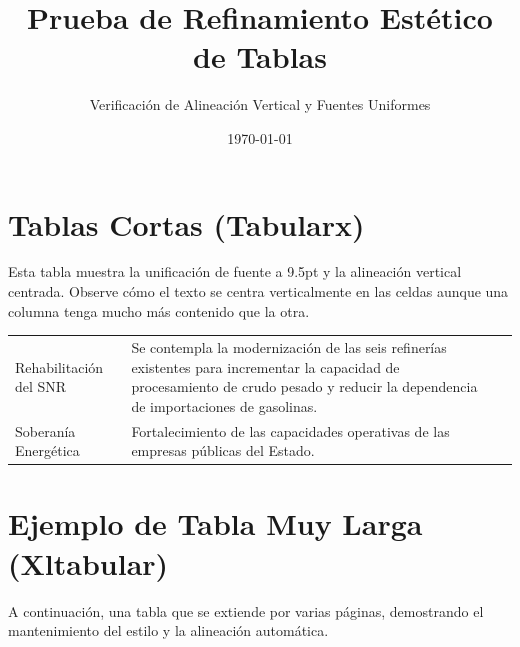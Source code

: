 \documentclass{sener2025}
\title{Prueba de Refinamiento Estético de Tablas}
\subtitle{Verificación de Alineación Vertical y Fuentes Uniformes}
\date{\today}
\begin{document}
\maketitle


\section{Tablas Cortas (Tabularx)}

Esta tabla muestra la unificación de fuente a 9.5pt y la alineación vertical centrada. Observe cómo el texto se centra verticalmente en las celdas aunque una columna tenga mucho más contenido que la otra.

\begin{tabladoradoCorto}
  \begin{tabularx}{\textwidth}{V v v}
    \toprule
      &  &  \\
    \midrule
    Rehabilitación del SNR & Se contempla la modernización de las seis refinerías existentes para incrementar la capacidad de procesamiento de crudo pesado y reducir la dependencia de importaciones de gasolinas. &  \\
    Soberanía Energética & Fortalecimiento de las capacidades operativas de las empresas públicas del Estado. &  \\
    \bottomrule
  \end{tabularx}
\end{tabladoradoCorto}

\section{Ejemplo de Tabla Muy Larga (Xltabular)}

A continuación, una tabla que se extiende por varias páginas, demostrando el mantenimiento del estilo y la alineación automática.
\end{document}
